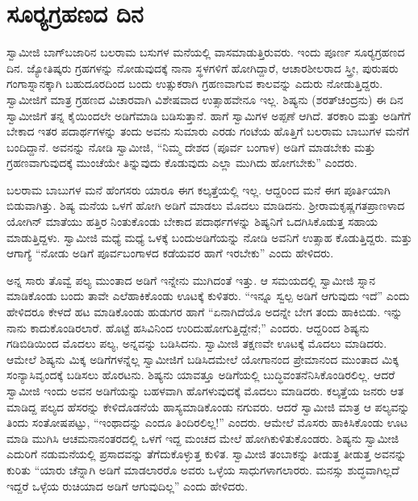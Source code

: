 
\chapter{ಸೂರ‍್ಯಗ್ರಹಣದ ದಿನ}

ಸ್ವಾಮೀಜಿ ಬಾಗ್‍ಬಜಾರಿನ ಬಲರಾಮ ಬಸುಗಳ ಮನೆಯಲ್ಲಿ ವಾಸಮಾಡುತ್ತಿರುವರು. ಇಂದು ಪೂರ್ಣ ಸೂರ‍್ಯಗ್ರಹಣದ ದಿನ. ಜ್ಯೋತಿಷ್ಕರು ಗ್ರಹಗಳನ್ನು ನೋಡುವುದಕ್ಕೆ ನಾನಾ ಸ್ಥಳಗಳಿಗೆ ಹೋಗಿದ್ದಾರೆ, ಆಚಾರಶೀಲರಾದ ಸ್ತ್ರೀ, ಪುರುಷರು ಗಂಗಾಸ್ನಾನಕ್ಕಾಗಿ ಬಹುದೂರದಿಂದ ಬಂದು ಉತ್ಸುಕರಾಗಿ ಗ್ರಹಣವಾಗುವ ಕಾಲವನ್ನು ಎದುರು ನೋಡುತ್ತಿದ್ದರು. ಸ್ವಾಮೀಜಿಗೆ ಮಾತ್ರ ಗ್ರಹಣದ ವಿಚಾರವಾಗಿ ವಿಶೇಷವಾದ ಉತ್ಸಾಹವೇನೂ ಇಲ್ಲ. ಶಿಷ್ಯನು (ಶರತ್‍ಚಂದ್ರನು) ಈ ದಿನ ಸ್ವಾಮೀಜಿಗೆ ತನ್ನ ಕೈಯಿಂದಲೇ ಅಡಿಗೆಮಾಡಿ ಬಡಿಸುತ್ತಾನೆ. ಹಾಗೆ ಸ್ವಾಮಿಗಳ ಅಪ್ಪಣೆ ಆಗಿದೆ. ತರಕಾರಿ ಮತ್ತು ಅಡಿಗೆಗೆ ಬೇಕಾದ ಇತರ ಪದಾರ್ಥಗಳನ್ನು ತಂದು ಅವನು ಸುಮಾರು ಎರಡು ಗಂಟೆಯ ಹೊತ್ತಿಗೆ ಬಲರಾಮ ಬಾಬುಗಳ ಮನೆಗೆ ಬಂದಿದ್ದಾನೆ. ಅವನನ್ನು ನೋಡಿ ಸ್ವಾಮೀಜಿ, “ನಿಮ್ಮ ದೇಶದ (ಪೂರ್ವ ಬಂಗಾಳ) ಅಡಿಗೆ ಮಾಡಬೇಕು ಮತ್ತು ಗ್ರಹಣವಾಗುವುದಕ್ಕೆ ಮುಂಚೆಯೇ ತಿನ್ನುವುದು ಕೊಡುವುದು ಎಲ್ಲಾ ಮುಗಿದು ಹೋಗಬೇಕು” ಎಂದರು. 

 ಬಲರಾಮ ಬಾಬುಗಳ ಮನೆ ಹೆಂಗಸರು ಯಾರೂ ಈಗ ಕಲ್ಕತ್ತೆಯಲ್ಲಿ ಇಲ್ಲ. ಆದ್ದರಿಂದ ಮನೆ ಈಗ ಪೂರ್ತಿಯಾಗಿ ಬಿಡುವಾಗಿತ್ತು. ಶಿಷ್ಯ ಮನೆಯ ಒಳಗೆ ಹೋಗಿ ಅಡಿಗೆ ಮಾಡಲು ಮೊದಲು ಮಾಡಿದನು. ಶ‍್ರೀರಾಮಕೃಷ್ಣಗತಪ್ರಾಣಳಾದ ಯೋಗಿನ್ ಮಾತೆಯು ಹತ್ತಿರ ನಿಂತುಕೊಂಡು ಬೇಕಾದ ಪದಾರ್ಥಗಳನ್ನು ಶಿಷ್ಯನಿಗೆ ಒದಗಿಸಿಕೊಡುತ್ತ ಸಹಾಯ ಮಾಡುತ್ತಿದ್ದಳು. ಸ್ವಾಮೀಜಿ ಮಧ್ಯೆ ಮಧ್ಯೆ ಒಳಕ್ಕೆ ಬಂದು\break ಅಡಿಗೆಯನ್ನು ನೋಡಿ ಅವನಿಗೆ ಉತ್ಸಾಹ ಕೊಡುತ್ತಿದ್ದರು. ಮತ್ತು ಆಗಾಗ್ಯೆ “ನೋಡು ಅಡಿಗೆ ಪೂರ್ವಬಂಗಾಳದ ಕಡೆಯವರ ಹಾಗೆ ಇರಬೇಕು” ಎಂದು ಹೇಳಿದರು. 

 ಅನ್ನ ಸಾರು ತೊವ್ವೆ ಪಲ್ಯ ಮುಂತಾದ ಅಡಿಗೆ ಇನ್ನೇನು ಮುಗಿದಂತೆ ಇತ್ತು. ಆ ಸಮಯದಲ್ಲಿ ಸ್ವಾಮೀಜಿ ಸ್ನಾನ ಮಾಡಿಕೊಂಡು ಬಂದು ತಾವೇ ಎಲೆಹಾಕಿಕೊಂಡು ಊಟಕ್ಕೆ ಕುಳಿತರು. “ಇನ್ನೂ ಸ್ವಲ್ಪ ಅಡಿಗೆ ಆಗುವುದು ಇದೆ” ಎಂದು ಹೇಳಿದರೂ ಕೇಳದೆ ಹಟ ಮಾಡಿಕೊಂಡು ಹುಡುಗರ ಹಾಗೆ “ಏನಾಗಿದೆಯೊ ಅದನ್ನೇ ಬೇಗ ತಂದು ಹಾಕಿಬಿಡು. ಇನ್ನು ನಾನು ಕಾದುಕೊಂಡಿರಲಾರೆ. ಹೊಟ್ಟೆ ಹಸಿವಿನಿಂದ ಉರಿದುಹೋಗುತ್ತಿದ್ದೇನೆ;” ಎಂದರು. ಆದ್ದರಿಂದ ಶಿಷ್ಯನು ಗಡಿಬಿಡಿಯಿಂದ ಮೊದಲು ಪಲ್ಯ, ಅನ್ನವನ್ನು ಬಡಿಸಿದನು. ಸ್ವಾಮೀಜಿ ತಕ್ಷಣವೇ ಊಟಕ್ಕೆ ಮೊದಲು ಮಾಡಿದರು. ಆಮೇಲೆ ಶಿಷ್ಯನು ಮಿಕ್ಕ ಅಡಿಗೆಗಳನ್ನೆಲ್ಲ ಸ್ವಾಮೀಜಿಗೆ ಬಡಿಸಿದಮೇಲೆ ಯೋಗಾನಂದ ಪ್ರೇಮಾನಂದ ಮುಂತಾದ ಮಿಕ್ಕ ಸಂನ್ಯಾಸಿವೃಂದಕ್ಕೆ ಬಡಿಸಲು ಹೊರಟನು. ಶಿಷ್ಯನು ಯಾವತ್ತೂ ಅಡಿಗೆಯಲ್ಲಿ ಬುದ್ಧಿವಂತನೆನಿಸಿಕೊಂಡಿರಲಿಲ್ಲ. ಆದರೆ ಸ್ವಾಮೀಜಿ ಇಂದು ಅವನ ಅಡಿಗೆಯನ್ನು ಬಹಳವಾಗಿ ಹೊಗಳುವುದಕ್ಕೆ ಮೊದಲು ಮಾಡಿದರು. ಕಲ್ಕತ್ತೆಯ ಜನರು ಆತ ಮಾಡಿದ್ದ ಪಲ್ಯದ ಹೆಸರನ್ನು ಕೇಳಿದೊಡನೆಯೆ ಹಾಸ್ಯಮಾಡಿಕೊಂಡು ನಗುವರು. ಆದರೆ ಸ್ವಾಮೀಜಿ ಮಾತ್ರ ಆ ಪಲ್ಯವನ್ನು ತಿಂದು ಸಂತೋಷಪಟ್ಟು, “ಇಂಥಾದನ್ನು ಎಂದೂ ತಿಂದಿರಲಿಲ್ಲ!” ಎಂದರು. ಆಮೇಲೆ ಮೊಸರು ಹಾಕಿಸಿಕೊಂಡು ಊಟ ಮಾಡಿ ಮುಗಿಸಿ ಆಚಮನಾನಂತರದಲ್ಲಿ ಒಳಗೆ ಇದ್ದ ಮಂಚದ ಮೇಲೆ ಹೋಗಿ\break ಕುಳಿತುಕೊಂಡರು. ಶಿಷ್ಯನು ಸ್ವಾಮೀಜಿ ಎದುರಿಗೆ ನಡುಮನೆಯಲ್ಲಿ ಪ್ರಸಾದವನ್ನು ತೆಗೆದುಕೊಳ್ಳುತ್ತ ಕುಳಿತ. ಸ್ವಾಮೀಜಿ ತಂಬಾಕನ್ನು ತೀಡುತ್ತ ತೀಡುತ್ತ ಅವನನ್ನು ಕುರಿತು “ಯಾರು ಚೆನ್ನಾಗಿ ಅಡಿಗೆ ಮಾಡಲಾರರೊ ಅವರು ಒಳ್ಳೆಯ ಸಾಧುಗಳಾಗಲಾರರು. ಮನಸ್ಸು ಶುದ್ಧವಾಗಿಲ್ಲದೆ ಇದ್ದರೆ ಒಳ್ಳೆಯ ರುಚಿಯಾದ ಅಡಿಗೆ ಆಗುವುದಿಲ್ಲ” ಎಂದು ಹೇಳಿದರು. 

